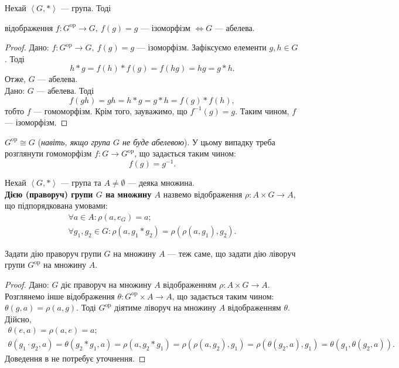 \documentclass{math_library}
\begin{document}
\begin{proposition}
Нехай $\left<G,*\right>$ --- група. Тоді
\begin{center}
відображення $f \colon G^{\text{op}} \to G,\ f(g) = g$ --- ізоморфізм $\iff G$ --- абелева.
\end{center}
\end{proposition}

\begin{proof}
\rightproof Дано: $f \colon G^{\text{op}} \to G,\ f(g) = g$ --- ізоморфізм. Зафіксуємо елементи $g,h \in G$. Тоді 
\[
h*g = f(h)*f(g) = f(hg) = hg = g*h.
\] 
Отже, $G$ --- абелева.
\bigskip \\
\leftproof Дано: $G$ --- абелева. Тоді 
\[
f(gh) = gh = h*g = g*h = f(g)*f(h),
\] тобто $f$ --- гомоморфізм. Крім того, зауважимо, що $f^{-1}(g) = g$. Таким чином, $f$ --- ізоморфізм. 
\end{proof}

\begin{remark}
$G^{\text{op}} \cong G$ (\textit{навіть, якщо група $G$ не буде абелевою}). У цьому випадку треба розглянути гомоморфізм $f \colon G \to G^{\text{op}}$, що задається таким чином: 
\[
f(g) = g^{-1}.
\]
\end{remark}

\begin{definition}
Нехай $\left<G,*\right>$ --- група та $A \neq \emptyset$ --- деяка множина.\\
\textbf{Дією (праворуч) групи $G$ на множину $A$} назвемо відображення $\rho \colon A \times G \to A$, що підпорядкована умовами:
\begin{align*}
\forall a \in A: \rho(a,e_G) = a; \\
\forall g_1,g_2 \in G: \rho(a,g_1*g_2) = \rho(\rho(a,g_1),g_2).
\end{align*}
\end{definition}

\begin{proposition}
Задати дію праворуч групи $G$ на множину $A$ --- теж саме, що задати дію ліворуч групи $G^{\text{op}}$ на множину $A$.
\end{proposition}

\begin{proof}
\rightproof Дано: $G$ діє праворуч на множину $A$ відображенням $\rho \colon A \times G \to A$. Розглянемо інше відображення $\theta \colon G^{\text{op}} \times A \to A$, що задається таким чином: $\theta(g,a) = \rho(a,g)$. Тоді $G^{\text{op}}$ діятиме ліворуч на множину $A$ відображенням $\theta$. Дійсно,
\begin{align*}
\theta(e,a) = \rho(a,e) = a; \\
\theta(g_1 \cdot g_2,a) = \theta(g_2*g_1,a) = \rho(a, g_2*g_1) = \rho(\rho(a,g_2), g_1) = \rho(\theta(g_2,a), g_1) = \theta(g_1,\theta(g_2,a)).
\end{align*}
Доведення в \leftproof не потребує уточнення.
\end{proof}
\end{document}
